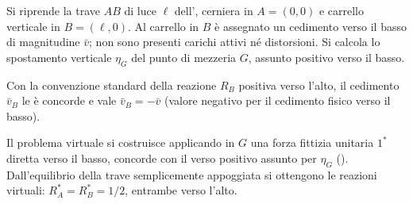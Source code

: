 \begin{esempio}
	\label{ex:TFV_cedimento}
	
	Si riprende la trave $AB$ di luce $\ell$ dell', cerniera in $A = (0,0)$ e carrello verticale in $B = (\ell,0)$. Al carrello in $B$ è assegnato un cedimento verso il basso di magnitudine $\bar{v}$; non sono presenti carichi attivi né distorsioni. Si calcola lo spostamento verticale $\eta_G$ del punto di mezzeria $G$, assunto positivo verso il basso.
	
	Con la convenzione standard della reazione $R_B$ positiva verso l'alto, il cedimento $\bar{v}_B$ le è concorde e vale $\bar{v}_B = -\bar{v}$ (valore negativo per il cedimento fisico verso il basso).
	
	Il problema virtuale si costruisce applicando in $G$ una forza fittizia unitaria $1^*$ diretta verso il basso, concorde con il verso positivo assunto per $\eta_G$ (). Dall'equilibrio della trave semplicemente appoggiata si ottengono le reazioni virtuali: $R_A^* = R_B^* = 1/2$, entrambe verso l'alto.
	\begin{figure}[ht]
		\centering
\end{figure}
\end{esempio}
